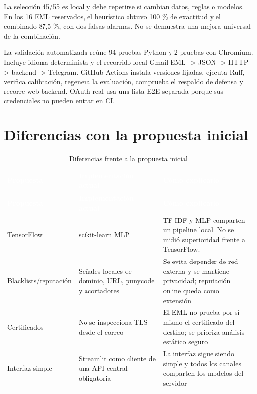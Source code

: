 \documentclass[11pt,a4paper]{article}
\begin{document}
La selección 45/\allowbreak{}55 es local y debe repetirse si cambian datos, reglas o modelos. En los 16 EML reservados, el heurístico obtuvo 100 \% de exactitud y el combinado 87,5 \%, con dos falsas alarmas. No se demuestra una mejora universal de la combinación.

La validación automatizada reúne 94 pruebas Python y 2 pruebas con Chromium. Incluye idioma determinista y el recorrido local Gmail EML -> JSON -> HTTP -> backend -> Telegram. GitHub Actions instala versiones fijadas, ejecuta Ruff, verifica calibración, regenera la evaluación, comprueba el respaldo de defensa y recorre web-backend. OAuth real usa una lista E2E separada porque sus credenciales no pueden entrar en CI.

\section{Diferencias con la propuesta inicial}

\begingroup
  \small
  \begin{xltabular}{\textwidth}{|>{\raggedright\arraybackslash}p{2.75cm}|X|X|}
  \caption{Diferencias frente a la propuesta inicial}\label{tab:comparativa-4}\\
    \hline
    \textcolor{white}{\textbf{Propuesta}} & \textcolor{white}{\textbf{Implementación actual}} & \textcolor{white}{\textbf{Cómo explicarlo}} \\
    \hline
    \endfirsthead
    \hline
    \textcolor{white}{\textbf{Propuesta}} & \textcolor{white}{\textbf{Implementación actual}} & \textcolor{white}{\textbf{Cómo explicarlo}} \\
    \hline
    \endhead
    TensorFlow & scikit-learn MLP & TF-IDF y MLP comparten un pipeline local. No se midió superioridad frente a TensorFlow. \\
    \hline
    Blacklists/\allowbreak{}reputación & Señales locales de dominio, URL, punycode y acortadores & Se evita depender de red externa y se mantiene privacidad; reputación online queda como extensión \\
    \hline
    Certificados & No se inspecciona TLS desde el correo & El EML no prueba por sí mismo el certificado del destino; se prioriza análisis estático seguro \\
    \hline
    Interfaz simple & Streamlit como cliente de una API central obligatoria & La interfaz sigue siendo simple y todos los canales comparten los modelos del servidor \\
    \hline
  \end{xltabular}
\endgroup
\end{document}
